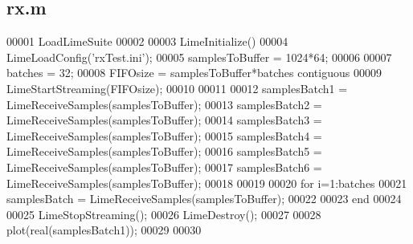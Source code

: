 \subsection{rx.\+m}
\label{rx_8m_source}

\begin{DoxyCode}
00001 LoadLimeSuite
00002 
00003 LimeInitialize()
00004 LimeLoadConfig('rxTest.ini');
00005 samplesToBuffer = 1024*64; %
00006 
00007 batches = 32;
00008 FIFOsize = samplesToBuffer*batches %
      contiguous
00009 LimeStartStreaming(FIFOsize);
00010 
00011 %
00012 samplesBatch1 = LimeReceiveSamples(samplesToBuffer);
00013 samplesBatch2 = LimeReceiveSamples(samplesToBuffer);
00014 samplesBatch3 = LimeReceiveSamples(samplesToBuffer);
00015 samplesBatch4 = LimeReceiveSamples(samplesToBuffer);
00016 samplesBatch5 = LimeReceiveSamples(samplesToBuffer);
00017 samplesBatch6 = LimeReceiveSamples(samplesToBuffer);
00018 
00019 %
00020 for i=1:batches
00021     samplesBatch = LimeReceiveSamples(samplesToBuffer);
00022     %
00023 end
00024 
00025 LimeStopStreaming();
00026 LimeDestroy();
00027 
00028 plot(real(samplesBatch1));
00029 %
00030 %
\end{DoxyCode}
